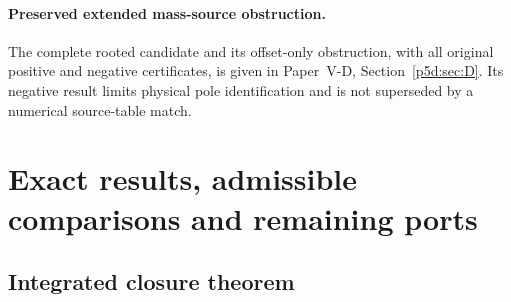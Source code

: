 \documentclass[12pt,a4paper]{article}
\begin{document}



\paragraph{Preserved extended mass-source obstruction.}
The complete rooted candidate and its offset-only obstruction,
with all original positive and negative certificates, is given in
Paper~V-D, Section~\ref{p5d:sec:D}. Its negative result
limits physical pole identification and is not superseded by a
numerical source-table match.

\section{Exact results, admissible comparisons and remaining ports}
\label{p5b:sec:organized-results}
\subsection{Integrated closure theorem}
\label{p6:sec:integrated-theorem}
\end{document}
